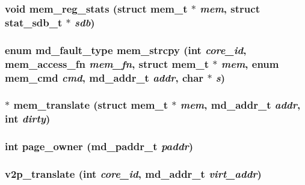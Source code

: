 \subsubsection[{mem\_\-reg\_\-stats}]{\setlength{\rightskip}{0pt plus 5cm}void mem\_\-reg\_\-stats (struct {\bf mem\_\-t} $\ast$ {\em mem}, \/  struct {\bf stat\_\-sdb\_\-t} $\ast$ {\em sdb})}\label{memory_8h_8707f3986260f7eb408598f1c8e4e5c5}


\subsubsection[{mem\_\-strcpy}]{\setlength{\rightskip}{0pt plus 5cm}enum {\bf md\_\-fault\_\-type} mem\_\-strcpy (int {\em core\_\-id}, \/  {\bf mem\_\-access\_\-fn} {\em mem\_\-fn}, \/  struct {\bf mem\_\-t} $\ast$ {\em mem}, \/  enum {\bf mem\_\-cmd} {\em cmd}, \/  {\bf md\_\-addr\_\-t} {\em addr}, \/  char $\ast$ {\em s})}\label{memory_8h_d4f0e69a043b9e0de5ba9b1237a2f645}


\subsubsection[{mem\_\-translate}]{$\ast$ mem\_\-translate (struct {\bf mem\_\-t} $\ast$ {\em mem}, \/  {\bf md\_\-addr\_\-t} {\em addr}, \/  int {\em dirty})}\label{memory_8h_17169f9bfb51490665d78c0ccc0b5023}


\subsubsection[{page\_\-owner}]{\setlength{\rightskip}{0pt plus 5cm}int page\_\-owner ({\bf md\_\-paddr\_\-t} {\em paddr})}\label{memory_8h_6d8733f7e3e27b600001064a1a8714c9}


\subsubsection[{v2p\_\-translate}]{ v2p\_\-translate (int {\em core\_\-id}, \/  {\bf md\_\-addr\_\-t} {\em virt\_\-addr})}\label{memory_8h_5ce286b386b22428c54847fd33a31fb9}


